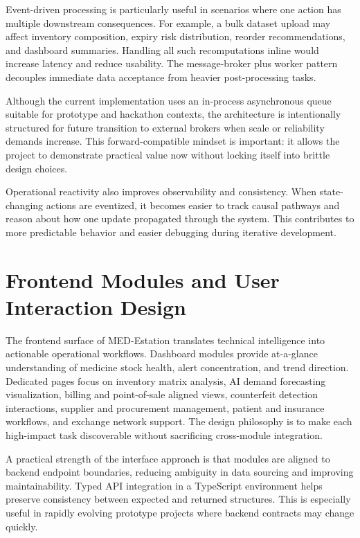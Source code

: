 \documentclass[12pt,a4paper]{report}
\begin{document}
Event-driven processing is particularly useful in scenarios where one action has multiple downstream consequences. For example, a bulk dataset upload may affect inventory composition, expiry risk distribution, reorder recommendations, and dashboard summaries. Handling all such recomputations inline would increase latency and reduce usability. The message-broker plus worker pattern decouples immediate data acceptance from heavier post-processing tasks.

Although the current implementation uses an in-process asynchronous queue suitable for prototype and hackathon contexts, the architecture is intentionally structured for future transition to external brokers when scale or reliability demands increase. This forward-compatible mindset is important: it allows the project to demonstrate practical value now without locking itself into brittle design choices.

Operational reactivity also improves observability and consistency. When state-changing actions are eventized, it becomes easier to track causal pathways and reason about how one update propagated through the system. This contributes to more predictable behavior and easier debugging during iterative development.

\chapter{Frontend Modules and User Interaction Design}
The frontend surface of MED-Estation translates technical intelligence into actionable operational workflows. Dashboard modules provide at-a-glance understanding of medicine stock health, alert concentration, and trend direction. Dedicated pages focus on inventory matrix analysis, AI demand forecasting visualization, billing and point-of-sale aligned views, counterfeit detection interactions, supplier and procurement management, patient and insurance workflows, and exchange network support. The design philosophy is to make each high-impact task discoverable without sacrificing cross-module integration.

A practical strength of the interface approach is that modules are aligned to backend endpoint boundaries, reducing ambiguity in data sourcing and improving maintainability. Typed API integration in a TypeScript environment helps preserve consistency between expected and returned structures. This is especially useful in rapidly evolving prototype projects where backend contracts may change quickly.
\end{document}
